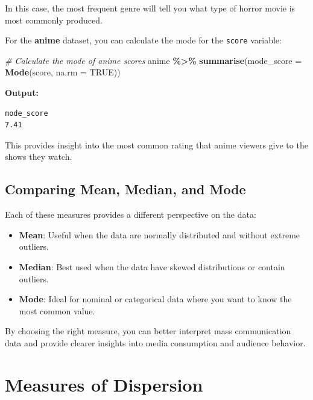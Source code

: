 \documentclass[
]{book}
\newenvironment{Shaded}{\begin{snugshade}}{\end{snugshade}}
\newcommand{\AttributeTok}[1]{\textcolor[rgb]{0.13,0.29,0.53}{#1}}
\newcommand{\CommentTok}[1]{\textcolor[rgb]{0.56,0.35,0.01}{\textit{#1}}}
\newcommand{\ConstantTok}[1]{\textcolor[rgb]{0.56,0.35,0.01}{#1}}
\newcommand{\FunctionTok}[1]{\textcolor[rgb]{0.13,0.29,0.53}{\textbf{#1}}}
\newcommand{\NormalTok}[1]{#1}
\newcommand{\SpecialCharTok}[1]{\textcolor[rgb]{0.81,0.36,0.00}{\textbf{#1}}}
\providecommand{\tightlist}{%
  \setlength{\itemsep}{0pt}\setlength{\parskip}{0pt}}
\begin{document}
In this case, the most frequent genre will tell you what type of horror movie is most commonly produced.

For the \textbf{anime} dataset, you can calculate the mode for the \texttt{score} variable:

\begin{Shaded}
\begin{Highlighting}[]
\CommentTok{\# Calculate the mode of anime scores}
\NormalTok{anime }\SpecialCharTok{\%\textgreater{}\%}
  \FunctionTok{summarise}\NormalTok{(}\AttributeTok{mode\_score =} \FunctionTok{Mode}\NormalTok{(score, }\AttributeTok{na.rm =} \ConstantTok{TRUE}\NormalTok{))}
\end{Highlighting}
\end{Shaded}

\textbf{Output:}

\begin{verbatim}
mode_score
7.41
\end{verbatim}

This provides insight into the most common rating that anime viewers give to the shows they watch.

\subsection*{Comparing Mean, Median, and Mode}\label{comparing-mean-median-and-mode}

Each of these measures provides a different perspective on the data:

\begin{itemize}
\tightlist
\item
  \textbf{Mean}: Useful when the data are normally distributed and without extreme outliers.
\item
  \textbf{Median}: Best used when the data have skewed distributions or contain outliers.
\item
  \textbf{Mode}: Ideal for nominal or categorical data where you want to know the most common value.
\end{itemize}

By choosing the right measure, you can better interpret mass communication data and provide clearer insights into media consumption and audience behavior.

\section{Measures of Dispersion}\label{measures-of-dispersion}
\end{document}
